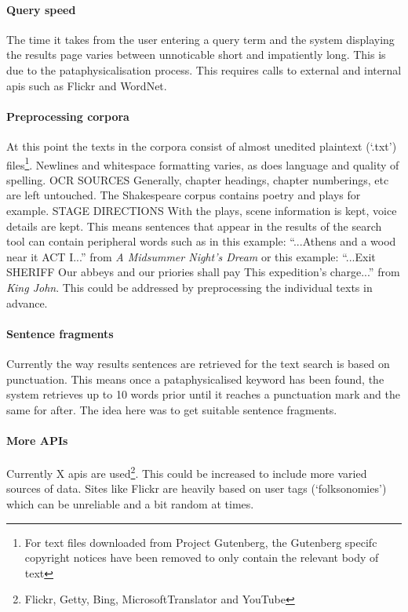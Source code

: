 \paragraph{Query speed} 
The time it takes from the user entering a query term and the system displaying the results page varies between unnoticable short and impatiently long. This is due to the pataphysicalisation process. This requires calls to external and internal \gls{api}s such as Flickr and WordNet.

\paragraph{Preprocessing corpora} 
At this point the texts in the corpora consist of almost unedited plaintext (`.txt') files\footnote{For text files downloaded from Project Gutenberg, the Gutenberg specifc copyright notices have been removed to only contain the relevant body of text}. Newlines and whitespace formatting varies, as does language and quality of spelling. OCR SOURCES Generally, chapter headings, chapter numberings, etc are left untouched. The Shakespeare corpus contains poetry and plays for example. STAGE DIRECTIONS With the plays, scene information is kept, voice details are kept. This means sentences that appear in the results of the search tool can contain peripheral words such as in this example: ``...Athens and a wood near it ACT I...'' from \textit{A Midsummer Night's Dream} or this example: ``...Exit SHERIFF Our abbeys and our priories shall pay This expedition's charge...'' from \textit{King John}. This could be addressed by preprocessing the individual texts in advance.

\paragraph{Sentence fragments} 
Currently the way results sentences are retrieved for the text search is based on punctuation. This means once a pataphysicalised keyword has been found, the system retrieves up to 10 words prior until it reaches a punctuation mark and the same for after. The idea here was to get suitable sentence fragments.

\paragraph{More APIs} 
Currently X \gls{api}s are used\footnote{Flickr, Getty, Bing, MicrosoftTranslator and YouTube}. This could be increased to include more varied sources of data. Sites like Flickr are heavily based on user tags (`folksonomies') which can be unreliable and a bit random at times.

